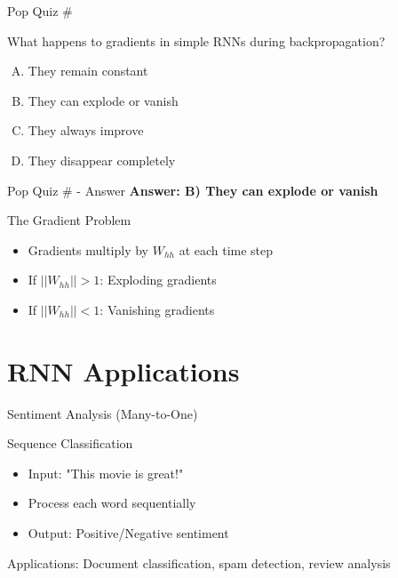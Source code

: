 \documentclass[usenames,dvipsnames]{beamer}
\begin{document}
	\begin{frame}{Pop Quiz \#\thepopquiz}
		\begin{popquizbox}{\thepopquiz}
			What happens to gradients in simple RNNs during backpropagation?
			
			\begin{enumerate}[A)]
				\item They remain constant
				\item They can explode or vanish
				\item They always improve
				\item They disappear completely
			\end{enumerate}
		\end{popquizbox}
	\end{frame}
	
	\begin{frame}{Pop Quiz \#\thepopquiz{} - Answer}
		\textbf{Answer: B) They can explode or vanish}
		
		\begin{alertbox}{The Gradient Problem}
			\begin{itemize}
				\item Gradients multiply by $W_{hh}$ at each time step
				\item If $||W_{hh}|| > 1$: Exploding gradients
				\item If $||W_{hh}|| < 1$: Vanishing gradients
			\end{itemize}
		\end{alertbox}
	\end{frame}
	
	\section{RNN Applications}
	
	\begin{frame}{Sentiment Analysis (Many-to-One)}
		\begin{examplebox}{Sequence Classification}
			\begin{itemize}
				\item Input: "This movie is great!"
				\item Process each word sequentially
				\item Output: Positive/Negative sentiment
			\end{itemize}
		\end{examplebox}
		
		\begin{keypointsbox}
			Applications: Document classification, spam detection, review analysis
		\end{keypointsbox}
	\end{frame}
	
\end{document}
